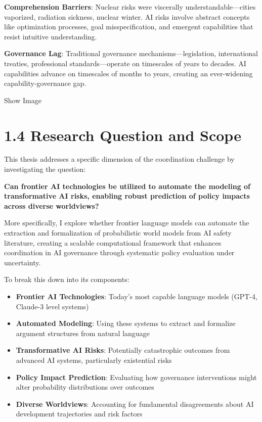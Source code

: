 \documentclass[
  11pt,
  letterpaper,
]{book}
\providecommand{\tightlist}{%
  \setlength{\itemsep}{0pt}\setlength{\parskip}{0pt}}
\begin{document}
\textbf{Comprehension Barriers}: Nuclear risks were viscerally
understandable---cities vaporized, radiation sickness, nuclear winter.
AI risks involve abstract concepts like optimization processes, goal
misspecification, and emergent capabilities that resist intuitive
understanding.

\textbf{Governance Lag}: Traditional governance
mechanisms---legislation, international treaties, professional
standards---operate on timescales of years to decades. AI capabilities
advance on timescales of months to years, creating an ever-widening
capability-governance gap.

Show Image

\section{1.4 Research Question and
Scope}\label{research-question-and-scope}

This thesis addresses a specific dimension of the coordination challenge
by investigating the question:

\textbf{Can frontier AI technologies be utilized to automate the
modeling of transformative AI risks, enabling robust prediction of
policy impacts across diverse worldviews?}

More specifically, I explore whether frontier language models can
automate the extraction and formalization of probabilistic world models
from AI safety literature, creating a scalable computational framework
that enhances coordination in AI governance through systematic policy
evaluation under uncertainty.

To break this down into its components:

\begin{itemize}
\tightlist
\item
  \textbf{Frontier AI Technologies}: Today's most capable language
  models (GPT-4, Claude-3 level systems)
\item
  \textbf{Automated Modeling}: Using these systems to extract and
  formalize argument structures from natural language
\item
  \textbf{Transformative AI Risks}: Potentially catastrophic outcomes
  from advanced AI systems, particularly existential risks
\item
  \textbf{Policy Impact Prediction}: Evaluating how governance
  interventions might alter probability distributions over outcomes
\item
  \textbf{Diverse Worldviews}: Accounting for fundamental disagreements
  about AI development trajectories and risk factors
\end{itemize}
\end{document}
